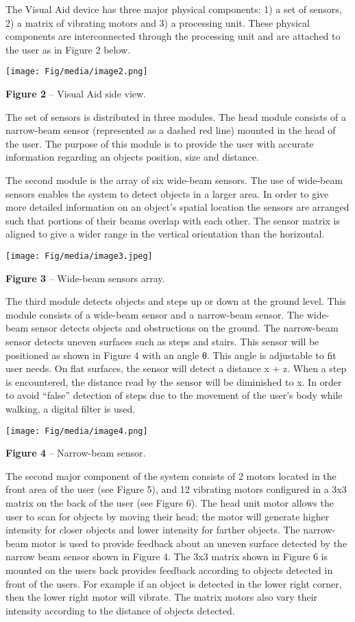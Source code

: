 The Visual Aid device has three major physical components: 1) a set of
sensors, 2) a matrix of vibrating motors and 3) a processing unit. These
physical components are interconnected through the processing unit and
are attached to the user as in Figure 2 below.

\texttt{[image: Fig/media/image2.png]}

\textbf{Figure 2} -- Visual Aid side view.

The set of sensors is distributed in three modules. The head module
consists of a narrow-beam sensor (represented as a dashed red line)
mounted in the head of the user. The purpose of this module is to
provide the user with accurate information regarding an objects
position, size and distance.

The second module is the array of six wide-beam sensors. The use of
wide-beam sensors enables the system to detect objects in a larger area.
In order to give more detailed information on an object's spatial
location the sensors are arranged such that portions of their beams
overlap with each other. The sensor matrix is aligned to give a wider
range in the vertical orientation than the horizontal.

\texttt{[image: Fig/media/image3.jpeg]}

\textbf{Figure 3} -- Wide-beam sensors array.

The third module detects objects and steps up or down at the ground
level. This module consists of a wide-beam sensor and a narrow-beam
sensor. The wide-beam sensor detects objects and obstructions on the
ground. The narrow-beam sensor detects uneven surfaces such as steps and
stairs. This sensor will be positioned as shown in Figure 4 with an
angle θ. This angle is adjustable to fit user needs. On flat surfaces,
the sensor will detect a distance x + z. When a step is encountered, the
distance read by the sensor will be diminished to x. In order to avoid
``false'' detection of steps due to the movement of the user's body
while walking, a digital filter is used.

\texttt{[image: Fig/media/image4.png]}

\textbf{Figure 4} -- Narrow-beam sensor.

The second major component of the system consists of 2 motors located in
the front area of the user (see Figure 5), and 12 vibrating motors
configured in a 3x3 matrix on the back of the user (see Figure 6). The
head unit motor allows the user to scan for objects by moving their
head; the motor will generate higher intensity for closer objects and
lower intensity for farther objects. The narrow-beam motor is used to
provide feedback about an uneven surface detected by the narrow beam
sensor shown in Figure 4. The 3x3 matrix shown in Figure 6 is mounted on
the users back provides feedback according to objects detected in front
of the users. For example if an object is detected in the lower right
corner, then the lower right motor will vibrate. The matrix motors also
vary their intensity according to the distance of objects detected.

